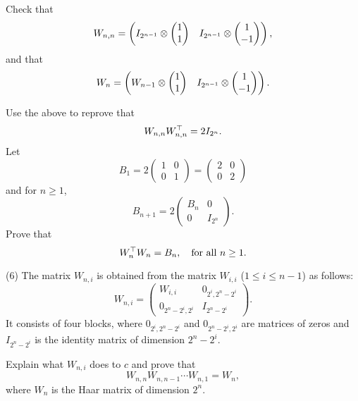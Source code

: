 \documentclass[12pt]{article}
\begin{document}
\medskip
Check that
\[
W_{n, n} =
\begin{pmatrix}
I_{2^{n-1}} \otimes 
\begin{pmatrix}
1 \\
1
\end{pmatrix}
& 
I_{2^{n-1}} \otimes 
\begin{pmatrix}
1 \\
-1
\end{pmatrix}
\end{pmatrix} ,
\]
and that
\[
W_{n} =
\begin{pmatrix}
W_{n-1} \otimes 
\begin{pmatrix}
1 \\
1
\end{pmatrix}
& 
I_{2^{n-1}} \otimes 
\begin{pmatrix}
1 \\
-1
\end{pmatrix}
\end{pmatrix} .
\]


\medskip
Use the above to reprove that
\[
W_{n, n}W_{n, n}^{\top} = 2I_{2^n}.
\]
Let
\[
B_1 =
2
\begin{pmatrix}
1 & 0 \\
0 & 1
\end{pmatrix}
= 
\begin{pmatrix}
2 & 0 \\
0 & 2
\end{pmatrix}
\]
and for $n \geq 1$,
\[
B_{n+1} =
2
\begin{pmatrix}
B_n & 0 \\
0 & I_{2^n}
\end{pmatrix}.
\]
Prove that
\[
W_n^{\top} W_n = B_n, \quad\hbox{for all $n \geq 1$}.
\]

\medskip
(6)
The matrix $W_{n, i}$ is obtained from the matrix $W_{i, i}$ 
($1 \leq i \leq n - 1$) as follows:
\[
W_{n, i} = 
\begin{pmatrix}
 W_{i, i} & 0_{2^{i}, 2^{n} - 2^{i}} \\
0_{2^{n}- 2^{i}, 2^i} & I_{2^{n} - 2^{i}}
\end{pmatrix}.
\]
It consists of four blocks,
where  $0_{2^{i}, 2^{n} - 2^{i}}$ and $0_{2^{n} - 2^{i}, 2^i}$
are matrices of zeros and $I_{2^{n} - 2^{i}}$ is the identity matrix of
dimension $2^{n} - 2^i$.

\medskip
Explain what $W_{n, i}$ does to $c$ and prove that
\[
W_{n, n} W_{n, n - 1} \cdots W_{n, 1} = W_n,
\]
where $W_n$ is the Haar matrix of dimension $2^n$.
\end{document}
